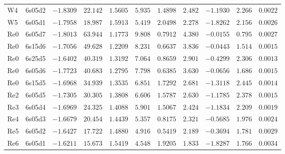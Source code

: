 \begin{table}[H]
{\begin{tabular}{llrrrrrrrrr}
W4 & 6s05d2 &$-1.8309$ &$22.142$ &$1.5605$ &$5.935$ &$1.4898$ &$2.482$ &$-1.1930$ &$2.266$ &$0.0022$ \\
W5 & 6s05d1 &$-1.7958$ &$18.987$ &$1.5913$ &$5.419$ &$2.0498$ &$2.278$ &$-1.8262$ &$2.156$ &$0.0026$ \\
Re0 & 6s05d7 &$-1.8013$ &$63.944$ &$1.1773$ &$9.808$ &$0.7912$ &$4.380$ &$-0.0155$ &$0.795$ &$0.0027$ \\
Re0 & 6s15d6 &$-1.7056$ &$49.628$ &$1.2209$ &$8.231$ &$0.6637$ &$3.836$ &$-0.0443$ &$1.514$ &$0.0015$ \\
Re0 & 6s25d5 &$-1.6402$ &$40.319$ &$1.3192$ &$7.064$ &$0.8659$ &$2.901$ &$-0.4299$ &$2.306$ &$0.0013$ \\
Re0 & 6s05d6 &$-1.7723$ &$40.683$ &$1.2795$ &$7.798$ &$0.6385$ &$3.630$ &$-0.0656$ &$1.686$ &$0.0015$ \\
Re0 & 6s15d5 &$-1.6968$ &$34.939$ &$1.3535$ &$6.851$ &$1.7292$ &$2.681$ &$-1.3118$ &$2.445$ &$0.0014$ \\
Re2 & 6s05d5 &$-1.7305$ &$30.305$ &$1.3808$ &$6.606$ &$1.5787$ &$2.630$ &$-1.1785$ &$2.378$ &$0.0015$ \\
Re3 & 6s05d4 &$-1.6969$ &$24.325$ &$1.4088$ &$5.901$ &$1.5067$ &$2.424$ &$-1.1834$ &$2.209$ &$0.0019$ \\
Re4 & 6s05d3 &$-1.6679$ &$20.454$ &$1.4439$ &$5.357$ &$0.8175$ &$2.321$ &$-0.5685$ &$1.976$ &$0.0024$ \\
Re5 & 6s05d2 &$-1.6427$ &$17.722$ &$1.4880$ &$4.916$ &$0.5419$ &$2.189$ &$-0.3694$ &$1.781$ &$0.0029$ \\
Re6 & 6s05d1 &$-1.6211$ &$15.673$ &$1.5419$ &$4.548$ &$1.9205$ &$1.833$ &$-1.8287$ &$1.766$ &$0.0034$ \\
\hline
\end{tabular}
}
\end{table}
